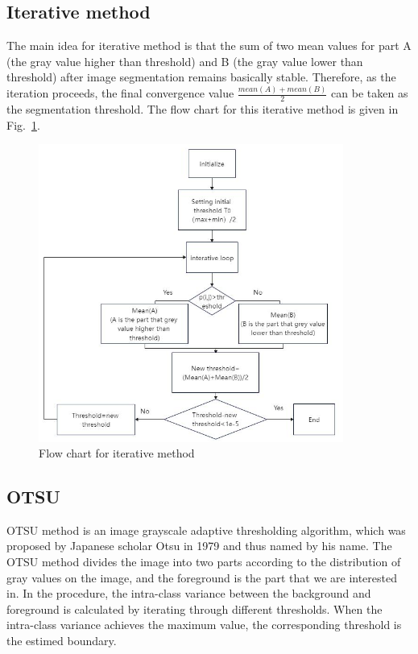 \documentclass[hyperref]{article}
\theoremstyle{nonumberplain}
\begin{document}
	\subsection{Iterative method}
	
	\hspace{1.0em}
	The main idea for iterative method is that the sum of two mean values for part A (the gray value higher than threshold) and B (the gray value lower than threshold) after image segmentation remains basically stable. Therefore, as the iteration proceeds, the final convergence value $\frac{mean(A)+mean(B)}{2}$ can be taken as the segmentation threshold. The flow chart for this iterative method is given in Fig.~\ref{fig4}.
	
	\begin{figure}[htbp]
		\centering
			\includegraphics[width=10cm]{fig4.jpg}
			\caption{Flow chart for iterative method}
		\label{fig4}
	\end{figure}
	
	\subsection{OTSU}
	
	\hspace{1.0em}
	OTSU method is an image grayscale adaptive thresholding algorithm, which was proposed by Japanese scholar Otsu in 1979 and thus named by his name. The OTSU method divides the image into two parts according to the distribution of gray values on the image, and the foreground is the part that we are interested in. In the procedure, the intra-class variance between the background and foreground is calculated by iterating through different thresholds. When the intra-class variance achieves the maximum value, the corresponding threshold is the estimed boundary.
	
\end{document}
